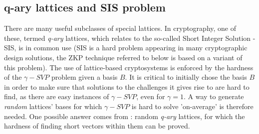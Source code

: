 \subsection{q-ary lattices and SIS problem}
\label{sub:q-ary lattices and SIS problem}
There are many useful subclasses of special lattices. In cryptography,
one of these, termed \emph{q-ary} lattices, which relates to the so-called
Short Integer Solution - SIS, is in common use (SIS is a hard problem appearing in many cryptographic design solutions, the ZKP technique referred to below is based on a variant of this problem). The use of lattice-based cryptosystems is enforced by the hardness of the
$\gamma-SVP$ problem given a basis $B$. It is critical to initially chose the
basis $B$ in order to make sure that solutions to the challenges it gives rise to are hard to find, as there are easy instances of $\gamma-SVP$, even for $\gamma=1$. A way to
generate \emph{random} lattices' bases for which $\gamma-SVP$ is hard to solve
'on-average' is therefore needed. One possible answer comes from \cite{ajtai1996generating}: random
\emph{q-ary} lattices, for which the hardness of finding short
vectors within them can be proved.

